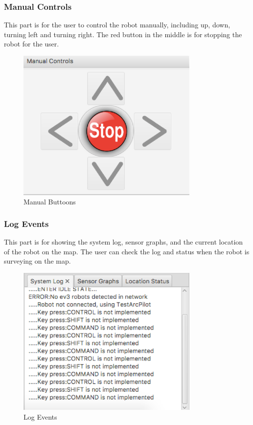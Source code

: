 \documentclass[10pt,a4paper,titlepage]{article}
\begin{document}
  \subsubsection{  Manual Controls} 
This part is for the user to control the robot manually, including up, down, turning left and turning right. The red button in the middle is for stopping the robot for the user.  \begin{figure}[H] 
  \includegraphics[width=0.8\textwidth]{buttons.png}  %
  \caption{Manual Buttoons} 
  \label{fig:Manual Buttoons}               
  \end{figure} 
   
   
  \subsubsection{Log Events} 
This part is for showing the system log, sensor graphs, and the current location of the robot on the map. The user can check the log and status when the robot is surveying on the map.  \begin{figure}[H] 
  \includegraphics[width=0.8\textwidth]{log.png}  %
  \caption{Log Events} 
  \label{fig:Log Events}               
  \end{figure} 
   
\end{document}
